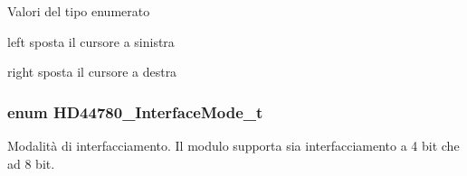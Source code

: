\begin{Desc}
\item[Valori del tipo enumerato]\par
\begin{description}
\item[{\em 
\hypertarget{group___h_d44780_ggaf46f4db4f981d3a1088804a6d6980d30aa4d704398d4edd1e0dec8dbb55f90292}{H\+D44780\+\_\+\+Cursor\+Left}\label{group___h_d44780_ggaf46f4db4f981d3a1088804a6d6980d30aa4d704398d4edd1e0dec8dbb55f90292}
}]left sposta il cursore a sinistra \item[{\em 
\hypertarget{group___h_d44780_ggaf46f4db4f981d3a1088804a6d6980d30a26006ced693b6bab28c6e30bfdb8c399}{H\+D44780\+\_\+\+Cursor\+Right}\label{group___h_d44780_ggaf46f4db4f981d3a1088804a6d6980d30a26006ced693b6bab28c6e30bfdb8c399}
}]right sposta il cursore a destra \end{description}
\end{Desc}
\hypertarget{group___h_d44780_gaaaea8b73e24f7658da4118f6b01b45f0}{
\subsubsection[{H\+D44780\+\_\+\+Interface\+Mode\+\_\+t}]{\setlength{\rightskip}{0pt plus 5cm}enum {\bf H\+D44780\+\_\+\+Interface\+Mode\+\_\+t}}}\label{group___h_d44780_gaaaea8b73e24f7658da4118f6b01b45f0}


Modalità di interfacciamento. Il modulo supporta sia interfacciamento a 4 bit che ad 8 bit. 

